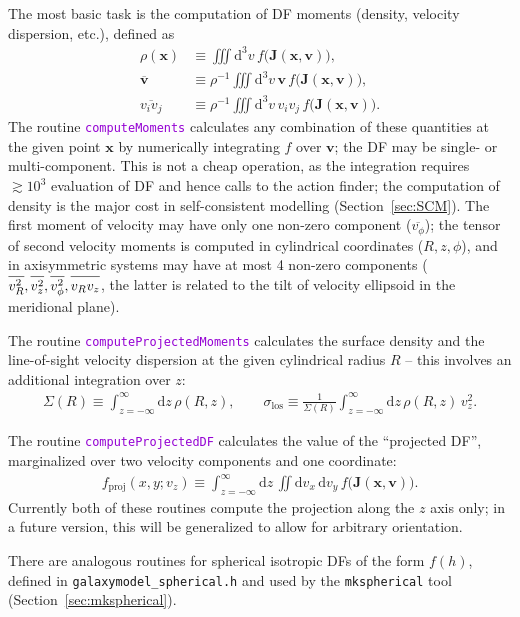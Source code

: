\documentclass[12pt]{article}
\newcommand{\ttt}[1]{\textcolor{darkviolet}{\texttt{#1}}}
\renewcommand{\d}{\mathrm{d}}
\newcommand{\bv}{\boldsymbol{v}}
\newcommand{\bx}{\boldsymbol{x}}
\newcommand{\bJ}{\boldsymbol{J}}
\begin{document}
The most basic task is the computation of DF moments (density, velocity dispersion, etc.), defined as
\begin{align*}
\rho(\bx) &\equiv \iiint \d ^3v\, f\big(\bJ(\bx,\bv)\big), \\
\overline{\bv} &\equiv \rho^{-1} \iiint \d ^3v \,\bv\, f\big(\bJ(\bx,\bv)\big), \\
\overline{v_i v_j} &\equiv \rho^{-1} \iiint \d ^3v \,v_i v_j\, f\big(\bJ(\bx,\bv)\big).
\end{align*}
The routine \ttt{computeMoments} calculates any combination of these quantities at the given point $\bx$ by numerically integrating $f$ over $\bv$; the DF may be single- or multi-component. 
This is not a cheap operation, as the integration requires $\gtrsim 10^3$ evaluation of DF and hence calls to the action finder; the computation of density is the major cost in self-consistent modelling (Section~\ref{sec:SCM}). The first moment of velocity may have only one non-zero component ($\overline{v_\phi}$); the tensor of second velocity moments is computed in cylindrical coordinates ($R,z,\phi$), and in axisymmetric systems may have at most 4 non-zero components ($\overline{\strut v_R^2}, \overline{\strut v_z^2}, \overline{\strut v_\phi^2}, \overline{\strut v_R v_z}$, the latter is related to the tilt of velocity ellipsoid in the meridional plane).

The routine \ttt{computeProjectedMoments} calculates the surface density and the line-of-sight velocity dispersion at the given cylindrical radius $R$ -- this involves an additional integration over $z$:
\begin{align*}
\Sigma(R) \equiv \int_{z=-\infty}^\infty \d z\, \rho(R,z), \qquad
\sigma_\mathrm{los} \equiv \frac{1}{\Sigma(R)} \int_{z=-\infty}^\infty \d z\, \rho(R,z)\, v_z^2 .
\end{align*}

The routine \ttt{computeProjectedDF} calculates the value of the ``projected DF'', marginalized over two velocity components and one coordinate:
\begin{align*}
f_\mathrm{proj}(x,y;v_z) \equiv \int_{z=-\infty}^\infty \d z\, \iint \d v_x\, \d v_y\, f\big(\bJ(\bx,\bv)\big) .
\end{align*}
Currently both of these routines compute the projection along the $z$ axis only; in a future version, this will be generalized to allow for arbitrary orientation.

There are analogous routines for spherical isotropic DFs of the form $f(h)$, defined in \texttt{galaxymodel_spherical.h} and used by the \texttt{mkspherical} tool (Section~\ref{sec:mkspherical}).
\end{document}
